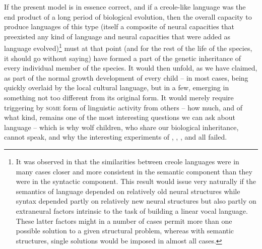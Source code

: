 If the present model is in essence correct, and if a creole-like language was the end product of a long period of biological evolution, then the overall capacity to produce languages of this type (itself a composite of neural capacities that preexisted any kind of language and neural capacities that were added as language evolved)\footnote{\label{Ch4:Fn15}It was observed in  that the similarities between creole languages were in many cases closer and more consistent in the semantic component than they were in the syntactic component. This result would issue very naturally if the semantics of language depended on relatively old neural structures while syntax depended partly on relatively new neural structures but also partly on extraneural factors intrinsic to the task of building a linear vocal language. These latter factors might in a number of cases permit more than one possible solution to a given structural problem, whereas with semantic structures, single solutions would be imposed in almost all cases.} must at that point (and for the rest of the life of the species, it should go without saying) have formed a part of the genetic inheritance of every individual member of the species. It would then unfold, as we have claimed, as part of the normal growth development of every child -- in most cases, being quickly overlaid by the local cultural language, but in a few, emerging in something not too different from its original form. It would merely require triggering by \textsc{some} form of linguistic activity from others -- how much, and of what kind, remains one of the most interesting questions we can ask about language -- which is why wolf children, who share our biological inheritance, cannot speak, and why the interesting experiments of , , , and  all failed.

